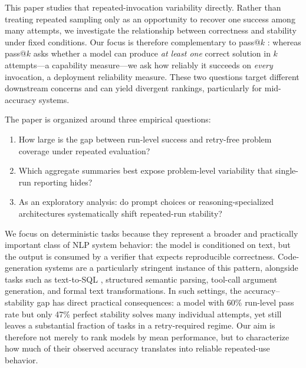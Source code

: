 \documentclass[11pt,a4paper]{article}
\begin{document}
This paper studies that repeated-invocation variability directly. Rather than treating repeated sampling only as an opportunity to recover one success among many attempts, we investigate the relationship between correctness and stability under fixed conditions. Our focus is therefore complementary to pass@$k$ \cite{chen2021codex}: whereas pass@$k$ asks whether a model can produce \emph{at least one} correct solution in $k$ attempts---a capability measure---we ask how reliably it succeeds on \emph{every} invocation, a deployment reliability measure. These two questions target different downstream concerns and can yield divergent rankings, particularly for mid-accuracy systems.

The paper is organized around three empirical questions:
\begin{enumerate}
  \item How large is the gap between run-level success and retry-free problem coverage under repeated evaluation?
  \item Which aggregate summaries best expose problem-level variability that single-run reporting hides?
  \item As an exploratory analysis: do prompt choices or reasoning-specialized architectures systematically shift repeated-run stability?
\end{enumerate}

We focus on deterministic tasks because they represent a broader and practically important class of NLP system behavior: the model is conditioned on text, but the output is consumed by a verifier that expects reproducible correctness. Code-generation systems are a particularly stringent instance of this pattern, alongside tasks such as text-to-SQL \cite{gao2023text}, structured semantic parsing, tool-call argument generation, and formal text transformations. In such settings, the accuracy--stability gap has direct practical consequences: a model with 60\% run-level pass rate but only 47\% perfect stability solves many individual attempts, yet still leaves a substantial fraction of tasks in a retry-required regime. Our aim is therefore not merely to rank models by mean performance, but to characterize how much of their observed accuracy translates into reliable repeated-use behavior.
\end{document}
